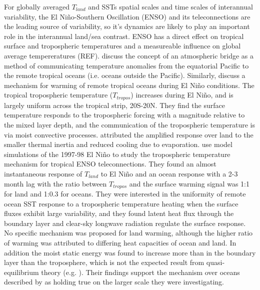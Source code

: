 For globally averaged $T_{land}$ and SSTs spatial scales and time scales of 
interannual variability, the El Ni{\~n}o-Southern Oscillation (ENSO) and its 
teleconnections are the leading source of variability, so it's dynamics are 
likely to play an important role in the interannual land/sea contrast.  ENSO has 
a direct effect on tropical surface and tropospheric temperatures and a 
measureable influence on global average tempereratures (REF). \citet{Klein1999} 
discuss the concept of an atmospheric bridge as a method of communicating 
temperature anomalies from the equatorial Pacific to the remote tropical oceans 
(i.e. oceans outside the Pacific).  Similarly, \citet{Chiang2002} discuss a 
mechanism for warming of remote tropical oceans during El Ni{\~n}o conditions.  
The tropical tropospheric temperature ($T_{tropos}$) increases during El 
Ni{\~n}o, and is largely uniform across the tropical strip, 20S-20N. They find 
the surface temperature responds to the tropospheric forcing with a magnitude 
relative to the mixed layer depth, and the communication of the tropospheric 
temperature is via moist convective processes. \citet{Chiang2002} attributed the 
amplified response over land to the smaller thermal inertia and reduced cooling 
due to evaporation.  \citet{Chiang2005} use model simulations of the 1997-98 El 
Ni{\~n}o to study the tropospheric temperature mechanism for tropical ENSO 
teleconnections.  They found an almost instantaneous response of $T_{land}$ to  
El Ni{\~n}o and an ocean response with a 2-3 month lag with the ratio between 
$T_{tropos}$ and the surface warming signal was 1:1 for land and 1:0.3 for 
oceans. They were interested in the uniformity of remote ocean SST response to a 
tropospheric temperature heating when the surface fluxes exhibit large 
variability, and they found latent heat flux through the boundary layer and 
clear-sky longwave radiation regulate the surface response. No specific 
mechanism was proposed for land warming, although the higher ratio of warming 
was attributed to differing heat capacities of ocean and land. In addition the 
moist static energy was found to increase more than in the boundary layer than 
the troposphere, which is not the expected result from quasi-equilibrium theory 
(e.g. \citet{Brown1997}).  Their findings support the mechanism over oceans 
described by \citet{Chiang2002} as holding true on the larger scale they were 
investigating. 

